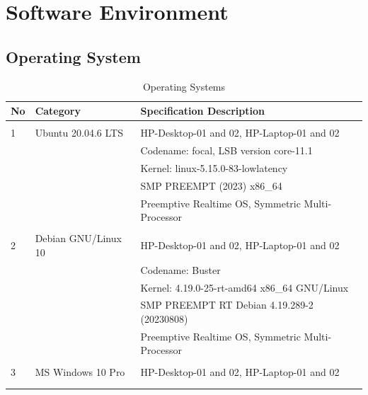 \clearpage
\pagebreak
\section{Software Environment}

\subsection{Operating System}

\begin{table}[ht]
\caption{Operating Systems}
\label{chap3-Operating Systems}

\begin{tabular}{p{0.5cm} p{4.30cm} p{9.2cm} }
\hline	
\textbf{No} & \textbf{Category}   &    \textbf{Specification Description}\\
\hline
  &                       &    \\
1 & Ubuntu 20.04.6 LTS    & HP-Desktop-01 and 02, HP-Laptop-01 and 02\\
  &                       & Codename: focal, LSB version core-11.1 \\                   
  &                       & Kernel: linux-5.15.0-83-lowlatency \\
  &                       & SMP PREEMPT (2023) x86\_64 \\
  &                       & Preemptive Realtime OS, Symmetric Multi-Processor\\
  &                       &    \\  
2 &	Debian GNU/Linux 10   & HP-Desktop-01 and 02, HP-Laptop-01 and 02\\
  &                       & Codename: Buster   \\
  &                       & Kernel: 4.19.0-25-rt-amd64 x86\_64 GNU/Linux \\
  &                       & SMP PREEMPT RT Debian 4.19.289-2 (20230808) \\  
  &                       & Preemptive Realtime OS, Symmetric Multi-Processor\\
  &                       &    \\
3 & MS Windows 10 Pro     & HP-Desktop-01 and 02, HP-Laptop-01 and 02 \\
  &                       &    \\
  &                       &    \\
\hline
\end{tabular}  
\end{table}

